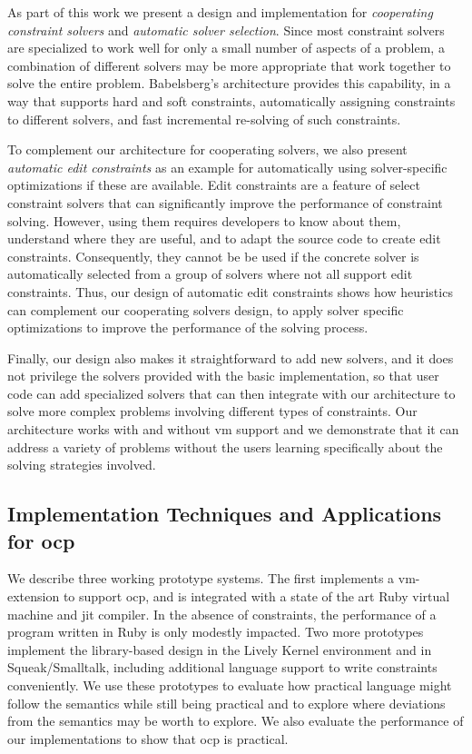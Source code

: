 As part of this work we present a design and implementation for
\emph{cooperating constraint solvers} and \emph{automatic solver
  selection}. Since most constraint solvers are specialized to work
well for only a small number of aspects of a problem, a combination of
different solvers may be more appropriate that work together to solve
the entire problem. Babelsberg's architecture provides this
capability, in a way that supports hard and soft constraints,
automatically assigning constraints to different solvers, and fast
incremental re-solving of such constraints.

To complement our architecture for cooperating solvers, we also present
\emph{automatic edit constraints} as an example for automatically using
solver-specific optimizations if these are available. Edit constraints are a
feature of select constraint solvers that can significantly improve the
performance of constraint solving. However, using them requires developers to
know about them, understand where they are useful, and to adapt the source code
to create edit constraints. Consequently, they cannot be be used if the concrete
solver is automatically selected from a group of solvers where not all support
edit constraints. Thus, our design of automatic edit constraints shows how
heuristics can complement our cooperating solvers design, to apply solver
specific optimizations to improve the performance of the solving process.

Finally, our design also makes it straightforward to add new solvers, and it
does not privilege the solvers provided with the basic implementation, so that
user code can add specialized solvers that can then integrate with our
architecture to solve more complex problems involving different types of
constraints. Our architecture works with and without \ac{vm} support and we
demonstrate that it can address a variety of problems without the users learning
specifically about the solving strategies involved.

\subsection{Implementation Techniques and Applications for \ac{ocp}}
We describe three working prototype systems. The first implements a
\ac{vm}-extension to support \ac{ocp}, and is integrated with a state
of the art Ruby virtual machine and \ac{jit} compiler. In the absence
of constraints, the performance of a program written in Ruby is only
modestly impacted. Two more prototypes implement the library-based
design in the Lively Kernel \javascript environment and in
Squeak/Smalltalk, including additional language support to write
constraints conveniently. We use these prototypes to evaluate how
practical language might follow the semantics while still being
practical and to explore where deviations from the semantics may be
worth to explore. We also evaluate the performance of our
implementations to show that \ac{ocp} is practical.

